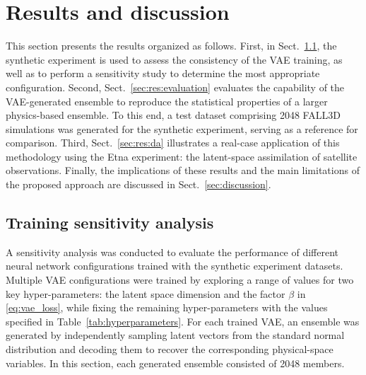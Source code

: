 \section{Results and discussion}
\label{sec:results}
This section presents the results organized as follows. First, in Sect.~\ref{sec:res:training}, the synthetic experiment is used to assess the consistency of the VAE training, as well as to perform a sensitivity study to determine the most appropriate configuration. Second, Sect.~\ref{sec:res:evaluation} evaluates the capability of the VAE-generated ensemble to reproduce the statistical properties of a larger physics-based ensemble. To this end, a test dataset comprising 2048 FALL3D simulations was generated for the synthetic experiment, serving as a reference for comparison. Third, Sect.~\ref{sec:res:da} illustrates a real-case application of this methodology using the Etna experiment: the latent-space assimilation of satellite observations. Finally, the implications of these results and the main limitations of the proposed approach are discussed in Sect.~\ref{sec:discussion}.
%
\subsection{Training sensitivity analysis} \label{sec:res:training}
A sensitivity analysis was conducted to evaluate the performance of different neural network configurations trained with the synthetic experiment datasets. Multiple VAE configurations were trained by exploring a range of values for two key hyper-parameters: the latent space dimension \latentDim and the factor $\beta$ in \eqref{eq:vae_loss}, while fixing the remaining hyper-parameters with the values specified in Table~\ref{tab:hyperparameters}.
%
%
For each trained VAE, an ensemble was generated by independently sampling latent vectors from the standard normal distribution and decoding them to recover the corresponding physical-space variables. In this section, each generated ensemble consisted of 2048 members.

